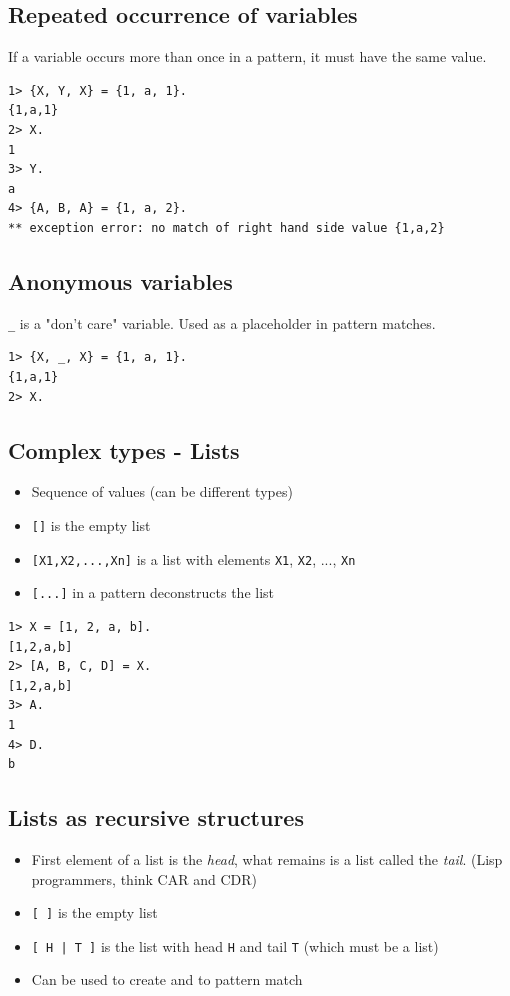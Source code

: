 \documentclass[12pt]{article}
\begin{document}
\subsection{Repeated occurrence of variables}

If a variable occurs more than once in a pattern,
it must have the same value.

\begin{verbatim}
1> {X, Y, X} = {1, a, 1}.
{1,a,1}
2> X.
1
3> Y.
a
4> {A, B, A} = {1, a, 2}.
** exception error: no match of right hand side value {1,a,2}
\end{verbatim}


\subsection{Anonymous variables}

\verb+_+ is a "don't care" variable. Used as a placeholder in pattern
matches.

\begin{verbatim}
1> {X, _, X} = {1, a, 1}.
{1,a,1}
2> X.
\end{verbatim}

\subsection{Complex types - Lists}

\begin{itemize}
\item Sequence of values (can be different types)
\item \verb+[]+ is the empty list
\item \verb+[X1,X2,...,Xn]+ is a list with elements \verb+X1+, \verb+X2+, ..., \verb+Xn+
\item \verb+[...]+ in a pattern deconstructs the list
\end{itemize}

\begin{verbatim}
1> X = [1, 2, a, b].
[1,2,a,b]
2> [A, B, C, D] = X.
[1,2,a,b]
3> A.
1
4> D.
b
\end{verbatim}

\subsection{Lists as recursive structures}

\begin{itemize}
\item First element of a list is the {\sl head}, what remains is a list
called the {\sl tail}. (Lisp programmers, think CAR and CDR)

\item \verb+[ ]+ is the empty list
\item \verb+[ H | T ]+ is the list with head \verb+H+ and tail \verb+T+ (which must be a list)

\item Can be used to create and to pattern match
\end{itemize}
\end{document}
